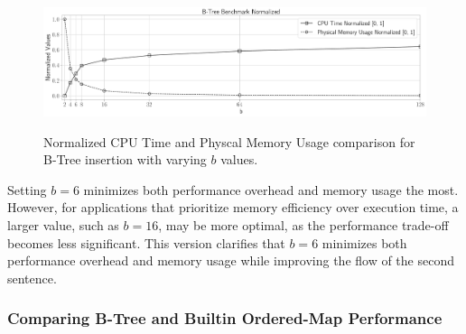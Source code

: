 \documentclass[12pt]{article}
\begin{document}
\begin{figure}[H]
	\centering
	\begin{minipage}{1\textwidth}
		\centering
		\includegraphics[width=\linewidth]{../notebook/plot/b-tree_benchmark_normalized.pdf}
		\label{fig:benchmark_normalized}
	\end{minipage}
	\caption{Normalized CPU Time and Physcal Memory Usage comparison for B-Tree insertion with varying $b$ values.}
\end{figure}

Setting $b = 6$ minimizes both performance overhead and memory usage the most. However, for applications that prioritize memory efficiency over execution time, a larger value, such as $b = 16$, may be more optimal, as the performance trade-off becomes less significant. This version clarifies that $b = 6$ minimizes both performance overhead and memory usage while improving the flow of the second sentence.

\subsubsection*{Comparing B-Tree and Builtin Ordered-Map Performance}
\end{document}
